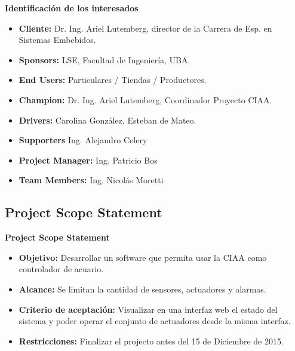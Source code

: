 \documentclass{beamer}
\begin{document}
\begin{frame}{\textbf{Identificación de los interesados}}
\fontsize{12pt}{15}\selectfont
\begin{itemize}
		\item \textbf{Cliente:} Dr. Ing. Ariel Lutemberg, director de la Carrera de Esp. en Sistemas Embebidos.
		\vspace{2px}
		\item \textbf{Sponsors:} LSE, Facultad de Ingeniería, UBA.
		\vspace{2px}
		\item \textbf{End Users:} Particulares / Tiendas / Productores.
		\vspace{2px}
		\item \textbf{Champion:} Dr. Ing. Ariel Lutemberg, Coordinador Proyecto CIAA.
		\vspace{2px}
		\item \textbf{Drivers:} Carolina González, Esteban de Mateo.
		\vspace{2px}
		\item \textbf{Supporters} Ing. Alejandro Celery
		\vspace{2px}
		\item \textbf{Project Manager:} Ing. Patricio Bos
		\vspace{2px}
		\item \textbf{Team Members:} Ing. Nicolás Moretti
	\end{itemize}
\end{frame}

\subsection[Scope]{Project Scope Statement}

\begin{frame}{\textbf{Project Scope Statement}}
\fontsize{14pt}{15}\selectfont
\begin{itemize}
\item \textbf{Objetivo:} Desarrollar un software que permita usar la CIAA como controlador de acuario.
\vspace{5px}
\item \textbf{Alcance:} Se limitan la cantidad de sensores, actuadores y alarmas.
\vspace{5px}
\item \textbf{Criterio de aceptación:} Visualizar en una interfaz web el estado del sistema y poder operar el conjunto de actuadores desde la misma interfaz.
\vspace{5px}
\item \textbf{Restricciones:} Finalizar el projecto antes del 15 de Diciembre de 2015.
\end{itemize}
\end{frame}
\end{document}
